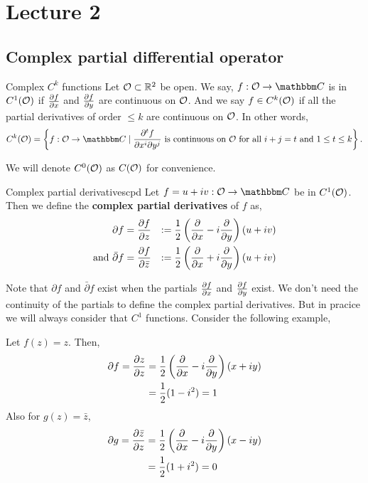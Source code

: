 \documentclass[../ComplexAnalysis_Notes.tex]{subfiles}
\begin{document}
\chapter*{Lecture 2} %
\setcounter{chapter}{2} %
\setcounter{section}{0}
\setcounter{equation}{0}
\setcounter{figure}{0}


\section{Complex partial differential operator}

\begin{Def}{Complex \(C^k\) functions}{}
  Let \(\mathcal{O} \subset \mathbb{R}^2\) be open. We say, \(f : \mO \to \C\) is in \(C^1(\mathcal{O})\) if \(\pdv{f}{x}\) and \(\pdv{f}{y}\) are continuous on \(\mathcal{O}\). And we say \(f \in C^k(\mathcal{O})\) if all the partial derivatives of order \(\leq k\) are continuous on \(\mathcal{O}\). In other words,
  \[
    C^k(\mO) = \left\{ f : \mO \to \C \mid \frac{\partial^t f}{\partial x^i \partial y^j} \text{ is continuous on } \mO \text{ for all } i+j = t \text{ and } 1 \leq t \leq k  \right\}.
  \]
\end{Def}

We will denote \(C^0(\mathcal{O})\) as \(C(\mathcal{O})\) for convenience.

\begin{Def}{Complex partial derivatives}{cpd}
  Let \(f = u + iv : \mO\to \C\) be in \(C^1(\mathcal{O})\). Then we define the \textbf{complex partial derivatives} of \(f\) as,
  \begin{alignat*}{2}
    {\partial f}                   & = \pdv{f}{z}       & := \frac 12 \left( \pdv{x} - i \pdv{y} \right)(u + iv) \\
    \text{and } {\bar{\partial} f} & = \pdv{f}{\bar{z}} & := \frac 12 \left( \pdv{x} + i \pdv{y} \right)(u + iv)
  \end{alignat*}
\end{Def}

Note that \({\partial f}\) and \({\bar{\partial} f}\) exist when the partials \(\pdv{f}{x}\) and \(\pdv{f}{y}\) exist. We don't need the continuity of the partials to define the complex partial derivatives. But in pracice we will always consider that \(C^1\) functions. Consider the following example,

\begin{Eg}{}{}
  Let \(f(z) = z\). Then,
  \begin{align*}
    \partial f = \pdv{z}{z} & = \frac 12 \left( \pdv{x} - i \pdv{y} \right)(x + iy) \\
                            & = \frac 12 (1 - i^2) = 1
  \end{align*}
  Also for \(g(z) = \bar{z}\),
  \begin{align*}
    \partial g = \pdv{\bar{z}}{z} & = \frac 12 \left( \pdv{x} - i \pdv{y} \right)(x - iy) \\
                                  & = \frac 12 (1 + i^2) = 0
  \end{align*}
\end{Eg}
\end{document}
